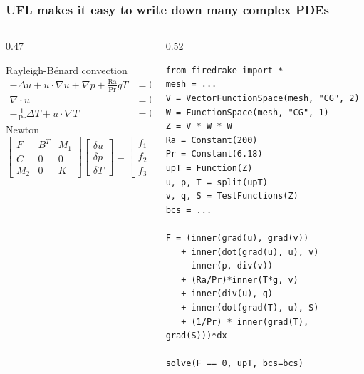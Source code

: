 \documentclass[presentation,aspectratio=43, 10pt]{beamer}
\begin{document}
\begin{frame}[fragile,t]
  \frametitle{UFL makes it easy to write down many complex PDEs}
  \begin{columns}[T]
    \begin{column}{0.47\framewidth}
      \small
      \begin{block}{Rayleigh-B\'enard convection}
        \begin{equation*}
          \begin{split}
            -\Delta u + u\cdot\nabla u + \nabla p +
            \frac{\text{Ra}}{\text{Pr}} \hat{g}T &= 0 \\
            \nabla \cdot u &= 0 \\
            - \frac{1}{\text{Pr}} \Delta T + u\cdot \nabla T &= 0
          \end{split}
        \end{equation*}
        Newton
        \begin{equation*}
          \begin{bmatrix}
            F   & B^T & M_1 \\
            C   & 0   & 0   \\
            M_2 & 0 & K
          \end{bmatrix}
          \begin{bmatrix}
            \delta u \\
            \delta p \\
            \delta T
          \end{bmatrix} =
          \begin{bmatrix}
            f_1 \\
            f_2 \\
            f_3
          \end{bmatrix}
        \end{equation*}
      \end{block}
    \end{column}
    \begin{column}{0.52\framewidth}
\begin{verbatim}
from firedrake import *
mesh = ...
V = VectorFunctionSpace(mesh, "CG", 2)
W = FunctionSpace(mesh, "CG", 1)
Z = V * W * W
Ra = Constant(200)
Pr = Constant(6.18)
upT = Function(Z)
u, p, T = split(upT)
v, q, S = TestFunctions(Z)
bcs = ...

F = (inner(grad(u), grad(v))
   + inner(dot(grad(u), u), v)
   - inner(p, div(v))
   + (Ra/Pr)*inner(T*g, v)
   + inner(div(u), q)
   + inner(dot(grad(T), u), S)
   + (1/Pr) * inner(grad(T), grad(S)))*dx

solve(F == 0, upT, bcs=bcs)
\end{verbatim}
    \end{column}
  \end{columns}
\end{frame}
\end{document}
